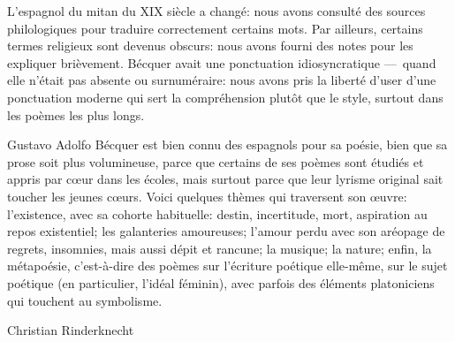 L'espagnol du mitan du XIX\ieme{} siècle a changé: nous avons
consulté des sources philologiques pour traduire correctement certains
mots. Par ailleurs, certains termes religieux sont devenus obscurs:
nous avons fourni des notes pour les expliquer brièvement. Bécquer
avait une ponctuation idiosyncratique ---~quand elle n'était pas
absente ou surnuméraire: nous avons pris la liberté d'user d'une
ponctuation moderne qui sert la compréhension plutôt que le style,
surtout dans les poèmes les plus longs.

Gustavo Adolfo Bécquer est bien connu des espagnols pour sa poésie,
bien que sa prose soit plus volumineuse, parce que certains de ses
poèmes sont étudiés et appris par cœur dans les écoles, mais surtout
parce que leur lyrisme original sait toucher les jeunes cœurs. Voici
quelques thèmes qui traversent son œuvre: l'existence, avec sa cohorte
habituelle: destin, incertitude, mort, aspiration au repos
existentiel; les galanteries amoureuses; l'amour perdu avec son
aréopage de regrets, insomnies, mais aussi dépit et rancune; la
musique; la nature; enfin, la métapoésie, c'est-à-dire des poèmes sur
l'écriture poétique elle-même, sur le sujet poétique (en particulier,
l'idéal féminin), avec parfois des éléments platoniciens qui touchent
au symbolisme.

\bigskip
\bigskip
\bigskip
\bigskip
\hfill Christian Rinderknecht

%
